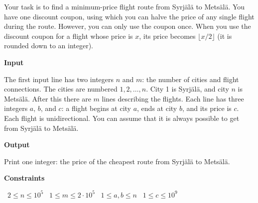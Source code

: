 Your task is to find a minimum-price flight route from Syrjälä to Metsälä. You have one discount coupon, using which you can halve the price of any single flight during the route. However, you can only use the coupon once.
When you use the discount coupon for a flight whose price is $x$, its price becomes $\lfloor x/2 \rfloor$ (it is rounded down to an integer).

\vspace{0.3cm}\noindent\textbf{Input}

The first input line has two integers $n$ and $m$: the number of cities and flight connections. The cities are numbered $1,2,\ldots,n$. City 1 is Syrjälä, and city $n$ is Metsälä.
After this there are $m$ lines describing the flights. Each line has three integers $a$, $b$, and $c$: a flight begins at city $a$, ends at city $b$, and its price is $c$. Each flight is unidirectional.
You can assume that it is always possible to get from Syrjälä to Metsälä.

\vspace{0.3cm}\noindent\textbf{Output}

Print one integer: the price of the cheapest route from Syrjälä to Metsälä.

\vspace{0.3cm}\noindent\textbf{Constraints}

\textbullet\ $2 \le n \le 10^5$
\textbullet\ $1 \le m \le 2 \cdot 10^5$
\textbullet\ $1 \le a,b \le n$
\textbullet\ $1 \le c \le 10^9$
